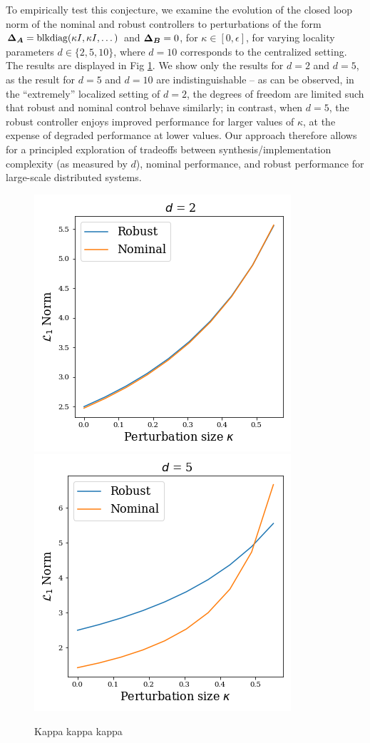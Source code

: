 To empirically test this conjecture, we examine the evolution of the closed loop norm of the nominal and robust controllers to perturbations of the form ${\boldsymbol{\Delta}}_{\boldsymbol{A}} = \mathrm{blkdiag}(\kappa I, \kappa I, \dots)$ and ${\boldsymbol{\Delta}}_{\boldsymbol{B}} = 0$, for $\kappa \in [0,\epsilon]$, for varying locality parameters $d\in\{2,5,10\}$, where $d=10$ corresponds to the centralized setting.  The results are displayed in Fig \ref{fig:kappa}.  We show only the results for $d=2$ and $d=5$, as the result for $d=5$ and $d=10$ are indistinguishable -- as can be observed, in the ``extremely'' localized setting of $d=2$, the degrees of freedom are limited such that robust and nominal control behave similarly; in contrast, when $d=5$, the robust controller enjoys improved performance for larger values of $\kappa$, at the expense of degraded performance at lower values.  Our approach therefore allows for a principled exploration of tradeoffs between synthesis/implementation complexity (as measured by $d$), nominal performance, and robust performance for large-scale distributed systems.

\begin{figure}
\includegraphics[width=.45\columnwidth]{d2.png}~\includegraphics[width=.45\columnwidth]{d5.png}
\caption{Kappa kappa kappa}
\label{fig:kappa}
\end{figure}

